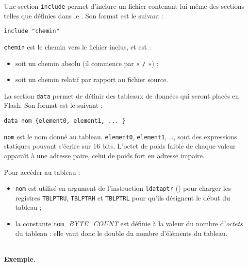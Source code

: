 
Une section \texttt{include} permet d'inclure un fichier contenant lui-même des sections telles que définies dans le .  Son format est le suivant :

\begin{lstlisting}[language=piccolo]
  include "chemin"
\end{lstlisting}

\texttt{chemin} est le chemin vers le fichier inclus, et est :
\begin{itemize}
  \item soit un chemin absolu (il commence par « \texttt{/} ») ;
  \item soit un chemin relatif par rapport au fichier source.
\end{itemize}









La section \texttt{data} permet de définir des tableaux de données qui seront placés en Flash. Son format est le suivant :

\begin{lstlisting}[language=piccolo]
  data nom {element0, element1, ... }
\end{lstlisting}

\texttt{nom} est le nom donné au tableau. \texttt{element0}, \texttt{element1}, …, sont des expressions statiques pouvant s'écrire sur 16 bits. L'octet de poids faible de chaque valeur apparaît à une adresse paire, celui de poids fort en adresse impaire.

Pour accéder au tableau :
\begin{itemize}
  \item \texttt{nom} est utilisé en argument de l'instruction \texttt{ldataptr} () pour charger les registres \texttt{TBLPTRU}, \texttt{TBLPTRH} et \texttt{TBLPTRL} pour qu'ils désignent le début du tableau ;
  \item la constante \texttt{nom}\emph{\small{\_BYTE\_COUNT}} est définie à la valeur du nombre d'\emph{octets} du tableau : elle vaut donc le double du nombre d'éléments du tableau.
\end{itemize}



~\\
\textbf{Exemple.} 

